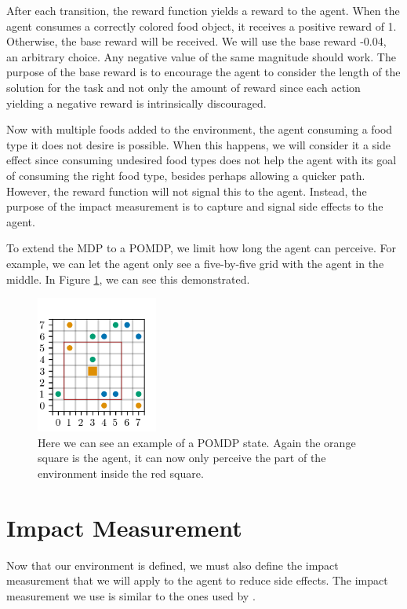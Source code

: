 \documentclass[12pt,A4]{report}
\theoremstyle{definition}
\begin{document}
After each transition, the reward function yields a reward to the agent. When the agent consumes a correctly colored food object, it receives a positive reward of 1. Otherwise, the base reward will be received. We will use the base reward -0.04, an arbitrary choice. Any negative value of the same magnitude should work. The purpose of the base reward is to encourage the agent to consider the length of the solution for the task and not only the amount of reward since each action yielding a negative reward is intrinsically discouraged. 

Now with multiple foods added to the environment, the agent consuming a food type it does not desire is possible. When this happens, we will consider it a side effect since consuming undesired food types does not help the agent with its goal of consuming the right food type, besides perhaps allowing a quicker path. However, the reward function will not signal this to the agent. Instead, the purpose of the impact measurement is to capture and signal side effects to the agent.


To extend the MDP to a POMDP, we limit how long the agent can perceive. For example, we can let the agent only see a five-by-five grid with the agent in the middle. In Figure \ref{fig:redline}, we can see this demonstrated. 

\begin{figure}[H]
  \centering
  \includegraphics[width=4cm]{"./figures/redline.png"}
  \caption{Here we can see an example of a POMDP state. Again the orange square is the agent, it can now only perceive the part of the environment inside the red square.}
  \label{fig:redline}
\end{figure}


\section{Impact Measurement}
Now that our environment is defined, we must also define the impact measurement that we will apply to the agent to reduce side effects. The impact measurement we use is similar to the ones used by \citet{Turner19,Krakovna19,Krakovna20}.
\end{document}
